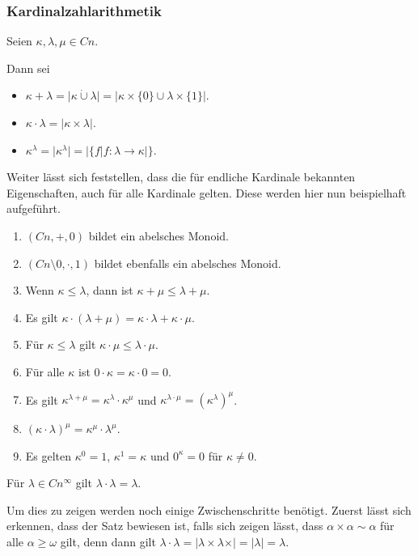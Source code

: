 \subsubsection{Kardinalzahlarithmetik}
Seien $\kappa,\lambda,\mu\in Cn$.

Dann sei
\begin{itemize}
	\item $\kappa+\lambda=\vert \kappa\dot{\cup} \lambda\vert=\vert \kappa\times\{0\} \cup \lambda\times \{1\}\vert$.
	\item $\kappa\cdot\lambda=\vert\kappa\times \lambda\vert$.
	\item $\kappa^\lambda = \vert \kappa^\lambda\vert=\vert\{f \vert f:\lambda\to\kappa\vert\}$.
\end{itemize}

Weiter lässt sich feststellen, dass die für endliche Kardinale bekannten Eigenschaften, auch für alle Kardinale gelten. Diese werden hier nun beispielhaft aufgeführt.

\begin{enumerate}
	\item $(Cn,+,0)$ bildet ein abelsches Monoid.
	\item $(Cn\setminus{0},\cdot, 1)$ bildet ebenfalls ein abelsches Monoid.
	\item Wenn $\kappa\leq\lambda$, dann ist $\kappa+\mu \leq \lambda+\mu$.
	\item Es gilt $\kappa\cdot(\lambda+\mu)=\kappa\cdot\lambda + \kappa\cdot\mu$.
	\item Für $\kappa\leq\lambda$ gilt $\kappa\cdot\mu \leq \lambda\cdot \mu$.
	\item Für alle $\kappa$ ist $0\cdot\kappa=\kappa\cdot 0=0$.
	\item Es gilt $\kappa^{\lambda+\mu}=\kappa^\lambda\cdot\kappa^\mu$ und $\kappa^{\lambda\cdot\mu}=(\kappa^\lambda)^\mu$.
	\item $(\kappa\cdot\lambda)^\mu=\kappa^\mu\cdot\lambda^\mu$.
	\item Es gelten $\kappa^0=1$, $\kappa^1=\kappa$ und $0^\kappa=0$ für $\kappa\neq0$.
\end{enumerate}

\begin{satz}[Hessenberg, 1906]
	Für $\lambda\in Cn^\infty$ gilt $\lambda\cdot\lambda=\lambda$.
\end{satz}
Um dies zu zeigen werden noch einige Zwischenschritte benötigt. Zuerst lässt sich erkennen, dass der Satz bewiesen ist, falls sich zeigen lässt, dass $\alpha\times\alpha\sim \alpha$ für alle $\alpha\geq\omega$ gilt, denn dann gilt $\lambda\cdot\lambda=\vert\lambda\times\lambda\times\vert=\vert\lambda\vert=\lambda$.


